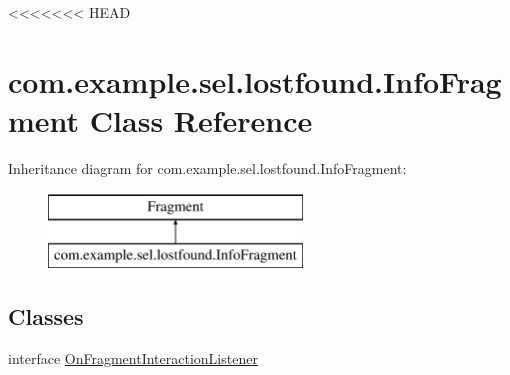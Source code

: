 <<<<<<< HEAD
\hypertarget{classcom_1_1example_1_1sel_1_1lostfound_1_1InfoFragment}{\section{com.\-example.\-sel.\-lostfound.\-Info\-Fragment Class Reference}
\label{classcom_1_1example_1_1sel_1_1lostfound_1_1InfoFragment}
}
Inheritance diagram for com.\-example.\-sel.\-lostfound.\-Info\-Fragment\-:\begin{figure}[H]
\begin{center}
\leavevmode
\includegraphics[height=2.000000cm]{classcom_1_1example_1_1sel_1_1lostfound_1_1InfoFragment}
\end{center}
\end{figure}
\subsection*{Classes}
\begin{DoxyCompactItemize}
\item 
interface \hyperlink{interfacecom_1_1example_1_1sel_1_1lostfound_1_1InfoFragment_1_1OnFragmentInteractionListener}{On\-Fragment\-Interaction\-Listener}
\end{DoxyCompactItemize}
